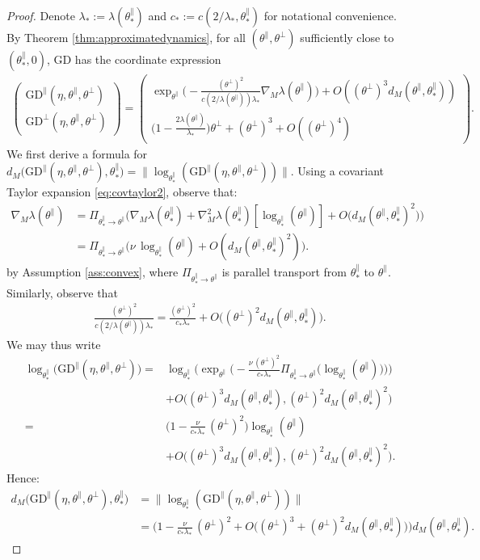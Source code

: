 \documentclass{article}
\newcommand{\tpa}{\theta^{\parallel}}
\newcommand{\tpe}{\theta^{\perp}}
\newcommand{\GD}{\mathrm{GD}}
\theoremstyle{plain}
\theoremstyle{definition}
\theoremstyle{remark}
\begin{document}
\begin{proof}
    Denote $\lambda_*:=\lambda(\tpa_*)$ and $c_*:=c(2/\lambda_*,\tpa_*)$ for notational convenience. By Theorem \ref{thm:approximatedynamics}, for all $(\tpa,\tpe)$ sufficiently close to $(\tpa_*,0)$, GD has the coordinate expression
    \begin{align}
        \begin{pmatrix} \GD^{\parallel}(\eta,\tpa,\tpe) \\ \GD^{\perp}(\eta,\tpa,\tpe)\end{pmatrix} =\begin{pmatrix}
            \exp_{\tpa}\bigg(-\frac{(\tpe)^2}{c(2/\lambda(\tpa))\lambda_*}\nabla_M\lambda(\tpa)\bigg)+O((\tpe)^3d_M(\tpa,\tpa_*)) \\ \bigg(1-\frac{2\lambda(\tpa)}{\lambda_*}\bigg)\tpe + (\tpe)^3 + O((\tpe)^4)
        \end{pmatrix}.
    \end{align}
    We first derive a formula for $d_M\big(\GD^{\parallel}(\eta,\tpa,\tpe),\tpa_*\big) = \|\log_{\tpa_*}(\GD^{\parallel}(\eta,\tpa,\tpe))\|$. Using a covariant Taylor expansion \eqref{eq:covtaylor2}, observe that:
    \begin{align}
        \nabla_M\lambda(\tpa) &= \Pi_{\tpa_*\rightarrow\tpa}\big(\nabla_M\lambda(\tpa_*) + \nabla^2_M\lambda(\tpa_*)[\log_{\tpa_*}(\tpa)] + O\big(d_M(\tpa,\tpa_*)^2\big)\big)\\&=\Pi_{\tpa_*\rightarrow\tpa}\big(\nu\,\log_{\tpa_*}(\tpa) + O(d_M(\tpa,\tpa_*)^2)\big).
    \end{align}
    by Assumption \ref{ass:convex}, where $\Pi_{\tpa_*\rightarrow\tpa}$ is parallel transport from $\tpa_*$ to $\tpa$. Similarly, observe that
    \begin{align}
        \frac{(\tpe)^2}{c(2/\lambda(\tpa))\lambda_*} = \frac{(\tpe)^2}{c_*\lambda_*} + O\big((\tpe)^2d_M(\tpa,\tpa_*)\big).
    \end{align}
    We may thus write
    \begin{align}
        \log_{\tpa_*}\big(\GD^{\parallel}(\eta,\tpa,\tpe)\big) =& \log_{\tpa_*}\bigg(\exp_{\tpa}\bigg(-\frac{\nu\,(\tpe)^2}{c_*\lambda_*}\Pi_{\tpa_*\rightarrow\tpa}\big(\log_{\tpa_*}(\tpa)\big)\bigg)\bigg)\\&+O\big((\tpe)^3d_M(\tpa,\tpa_*),(\tpe)^2d_M(\tpa,\tpa_*)^2\big)\\=&\bigg(1-\frac{\nu}{c_*\lambda_*}\,(\tpe)^2\bigg)\log_{\tpa_*}(\tpa)\\ &+ O\big((\tpe)^3d_M(\tpa,\tpa_*),(\tpe)^2d_M(\tpa,\tpa_*)^2\big).
    \end{align}
    Hence:
    \begin{align}
        d_M\big(\GD^{\parallel}(\eta,\tpa,\tpe),\tpa_*\big) &= \big\|\log_{\tpa_*}(\GD^{\parallel}(\eta,\tpa,\tpe))\big\|\\&=\bigg(1-\frac{\nu}{c_*\lambda_*}\,(\tpe)^2 + O\big((\tpe)^3 + (\tpe)^2d_M(\tpa,\tpa_*)\big)\bigg)d_M(\tpa,\tpa_*).
    \end{align}
    

\end{proof}
\end{document}

